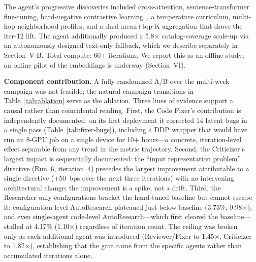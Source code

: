 \documentclass[conference]{IEEEtran}
\begin{document}
The agent's progressive discoveries included cross-attention, sentence-transformer fine-tuning, hard-negative contrastive learning~\cite{chen2020simclr,robinson2021hardneg,vandenoord2018cpc}, a temperature curriculum, multi-hop neighborhood profiles, and a dual mean+top-K aggregation that drove the iter-12 lift. The agent additionally produced a 5.8$\times$ catalog-coverage scale-up via an autonomously designed text-only fallback, which we describe separately in Section~V-B. Total compute: 60+ iterations. We report this as an offline study; an online pilot of the embeddings is underway (Section~VI).

\textbf{Component contribution.} A fully randomized A/B over the multi-week 
campaign was not feasible; the natural campaign transitions in Table~\ref{tab:ablation} serve as the ablation. Three lines of evidence support a 
causal rather than coincidental reading. First, the Code Fixer's contribution is independently documented: on its first deployment it corrected 14 latent bugs in a single pass (Table~\ref{tab:fixer-bugs}), including a DDP wrapper that would have run an 8-GPU job on a single device for 10+ hours---a concrete, iteration-level effect separable from any trend in the metric trajectory. Second, the Criticizer's largest impact is sequentially documented: the ``input representation problem'' directive (Run~6, iteration~4) precedes the largest improvement attributable to a single directive (+50~bps over the next three iterations) with no intervening architectural change; the improvement is a spike, not a drift. Third, the Researcher-only configurations bracket the hand-tuned baseline but cannot escape it: configuration-level AutoResearch plateaued just below baseline (3.73\%, 0.98$\times$), and even single-agent code-level AutoResearch---which first cleared the baseline---stalled at 4.17\% (1.10$\times$) regardless of iteration count. The ceiling was broken only as each additional agent was introduced (Reviewer/Fixer to 1.45$\times$, Criticizer to 1.82$\times$), establishing that the gain came from the specific agents rather than accumulated iterations alone.
\end{document}
